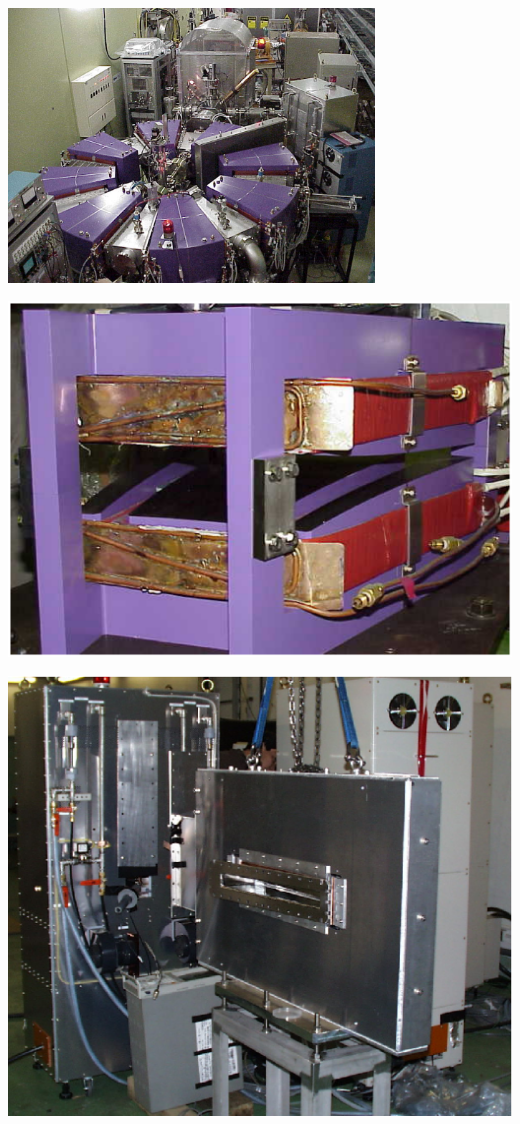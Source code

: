 \documentclass[12pt]{article}
\begin{document}


\large     

\begin{minipage}{.33\linewidth}

~~~~~~~~

\vspace{10mm} 

\hspace{-10mm} \includegraphics*[bbllx=0,bblly=0,bburx=1024,bbury=768,width=9.7cm]{./figs_FFAG_introSlides/PoPFFAG.eps}

\vspace{-90mm} 
\hspace{-10mm}\includegraphics[width=6.cm]{./figs_FFAG_introSlides/popMagnet.eps}

\vspace{55mm}

\includegraphics[width=5.cm]{./figs_FFAG_introSlides/FFAG31_cavity_Part.eps}

\vspace{-3mm}


\end{minipage}
\end{document}
